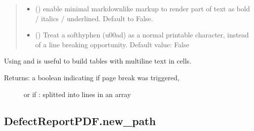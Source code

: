\documentclass[letterpaper,10pt,english]{sphinxmanual}
\begin{document}
\begin{fulllineitems}
\begin{fulllineitems}
\begin{quote}
\begin{description}
\begin{itemize}
\item {} 
\sphinxAtStartPar
{} () \textendash{} enable minimal markdown\sphinxhyphen{}like markup to render part
of text as bold / italics / underlined. Default to False.

\item {} 
\sphinxAtStartPar
{} () \textendash{} Treat a soft\sphinxhyphen{}hyphen (u00ad) as a normal printable
character, instead of a line breaking opportunity. Default value: False

\end{itemize}

\end{description}\end{quote}

\sphinxAtStartPar
Using  and  is useful to build tables
with multiline text in cells.
\begin{description}
\item[{Returns: a boolean indicating if page break was triggered,}] \leavevmode
\sphinxAtStartPar
or if :  splitted into lines in an array

\end{description}

\end{fulllineitems}



\subsection{DefectReportPDF.new\_path}
\label{\detokenize{generated/quality_assessment.quality_pdf_report.DefectReportPDF.new_path:defectreportpdf-new-path}}\label{\detokenize{generated/quality_assessment.quality_pdf_report.DefectReportPDF.new_path::doc}}


\end{fulllineitems}
\end{document}
